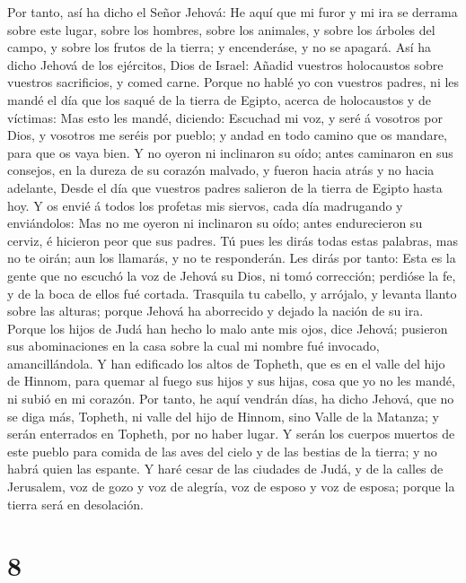  Por tanto, así ha dicho el Señor Jehová: He aquí que mi
furor y mi ira se derrama sobre este lugar, sobre los hombres, sobre los
animales, y sobre los árboles del campo, y sobre los frutos de la
tierra; y encenderáse, y no se apagará.  Así ha dicho
Jehová de los ejércitos, Dios de Israel: Añadid vuestros holocaustos
sobre vuestros sacrificios, y comed carne.  Porque no hablé
yo con vuestros padres, ni les mandé el día que los saqué de la tierra
de Egipto, acerca de holocaustos y de víctimas:  Mas esto
les mandé, diciendo: Escuchad mi voz, y seré á vosotros por Dios, y
vosotros me seréis por pueblo; y andad en todo camino que os mandare,
para que os vaya bien.  Y no oyeron ni inclinaron su oído;
antes caminaron en sus consejos, en la dureza de su corazón malvado, y
fueron hacia atrás y no hacia adelante,  Desde el día que
vuestros padres salieron de la tierra de Egipto hasta hoy. Y os envié á
todos los profetas mis siervos, cada día madrugando y enviándolos:
 Mas no me oyeron ni inclinaron su oído; antes endurecieron
su cerviz, é hicieron peor que sus padres.  Tú pues les
dirás todas estas palabras, mas no te oirán; aun los llamarás, y no te
responderán.  Les dirás por tanto: Esta es la gente que no
escuchó la voz de Jehová su Dios, ni tomó corrección; perdióse la fe, y
de la boca de ellos fué cortada.  Trasquila tu cabello, y
arrójalo, y levanta llanto sobre las alturas; porque Jehová ha
aborrecido y dejado la nación de su ira.  Porque los hijos
de Judá han hecho lo malo ante mis ojos, dice Jehová; pusieron sus
abominaciones en la casa sobre la cual mi nombre fué invocado,
amancillándola.  Y han edificado los altos de Topheth, que
es en el valle del hijo de Hinnom, para quemar al fuego sus hijos y sus
hijas, cosa que yo no les mandé, ni subió en mi corazón. 
Por tanto, he aquí vendrán días, ha dicho Jehová, que no se diga más,
Topheth, ni valle del hijo de Hinnom, sino Valle de la Matanza; y serán
enterrados en Topheth, por no haber lugar.  Y serán los
cuerpos muertos de este pueblo para comida de las aves del cielo y de
las bestias de la tierra; y no habrá quien las espante.  Y
haré cesar de las ciudades de Judá, y de la calles de Jerusalem, voz de
gozo y voz de alegría, voz de esposo y voz de esposa; porque la tierra
será en desolación.

\hypertarget{section-7}{%
\section{8}\label{section-7}}

